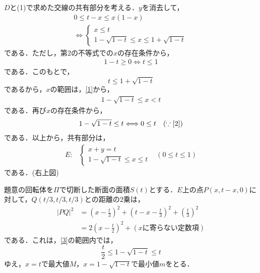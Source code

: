\documentclass[a4j]{jarticle}
\begin{document}
\begin{multicols}{2}
$D$と(1)で求めた交線の共有部分を考える．$y$を消去して，
     \begin{align}
     0\le t-x\le x(1-x) \\
     \Longleftrightarrow
          \begin{cases}
          x\le t \\
          1-\sqrt{1-t}\le x\le1+\sqrt{1-t}
          \end{cases}\label{1}
     \end{align}
である．ただし，第$2$の不等式での$x$の存在条件から，
     \begin{align}
     1-t\ge0\Longleftrightarrow t\le1\label{2}
     \end{align}
である．このもとで，    
     \[t\le1+\sqrt{1-t}\]
であるから，$x$の範囲は，\eqref{1}から，
     \begin{align*}
     1-\sqrt{1-t}\le x<t
     \end{align*} 
である．再び$x$の存在条件から，
     \begin{align}
     &1-\sqrt{1-t}\le t \Longleftrightarrow 0\le t&(\because\eqref{2})
     \end{align}
である．以上から，共有部分は，
     \begin{align}
          E:&\begin{cases}
          x+y=t \\
          1-\sqrt{1-t}\le x\le t
          \end{cases}
     &(0\le t\le1)\label{3}
     \end{align}
である．(右上図)
     \begin{center}
     \scalebox{.7}{}
     \end{center}
題意の回転体を$\Pi$で切断した断面の面積$S(t)$とする．$E$上の点$P(x,t-x,0)$に対して，$Q(t/3,t/3,t/3)$との距離の$2$乗は，
     \begin{align*}
     |PQ|^2&=\left(x-\frac{t}{3}\right)^2+\left(t-x-\frac{t}{3}\right)^2+\left(\frac{t}{3}\right)^2 \\
     &=2\left(x-\frac{t}{2}\right)^2+(\text{$x$に寄らない定数項})
     \end{align*}
である．これは，\eqref{3}の範囲内では，
     \[\frac{t}{2}\le1-\sqrt{1-t}\le t\]
ゆえ，$x=t$で最大値$M$，$x=1-\sqrt{1-t}$で最小値$m$をとる．

 \begin{minipage}{0.5\hsize}
     \begin{center}
     \scalebox{.5}{}
     \end{center}
 \end{minipage}
 \begin{minipage}{0.5\hsize}
  \begin{center}
       \scalebox{.5}{}
  \end{center}
 \end{minipage}


\end{multicols}
\end{document}
